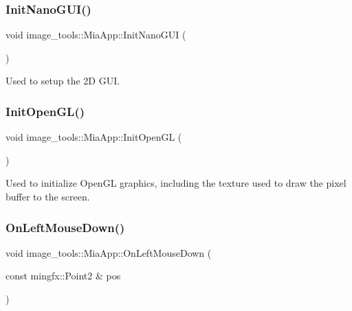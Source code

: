 \subsubsection{\texorpdfstring{Init\+Nano\+G\+U\+I()}{InitNanoGUI()}}
{\footnotesize\ttfamily void image\+\_\+tools\+::\+Mia\+App\+::\+Init\+Nano\+G\+UI (\begin{DoxyParamCaption}{ }\end{DoxyParamCaption})\hspace{0.3cm}{\ttfamily [override]}}

Used to setup the 2D G\+UI. \mbox{\label{classimage__tools_1_1MiaApp_ac59579850ed3ebdfcc1885f88238e887}} 
\subsubsection{\texorpdfstring{Init\+Open\+G\+L()}{InitOpenGL()}}
{\footnotesize\ttfamily void image\+\_\+tools\+::\+Mia\+App\+::\+Init\+Open\+GL (\begin{DoxyParamCaption}{ }\end{DoxyParamCaption})\hspace{0.3cm}{\ttfamily [override]}}

Used to initialize Open\+GL graphics, including the texture used to draw the pixel buffer to the screen. \mbox{\label{classimage__tools_1_1MiaApp_add49ee649aa2cd4f5a48cbe7ce932011}} 
\subsubsection{\texorpdfstring{On\+Left\+Mouse\+Down()}{OnLeftMouseDown()}}
{\footnotesize\ttfamily void image\+\_\+tools\+::\+Mia\+App\+::\+On\+Left\+Mouse\+Down (\begin{DoxyParamCaption}\item[{const mingfx\+::\+Point2 \&}]{pos }\end{DoxyParamCaption})\hspace{0.3cm}{\ttfamily [override]}}


